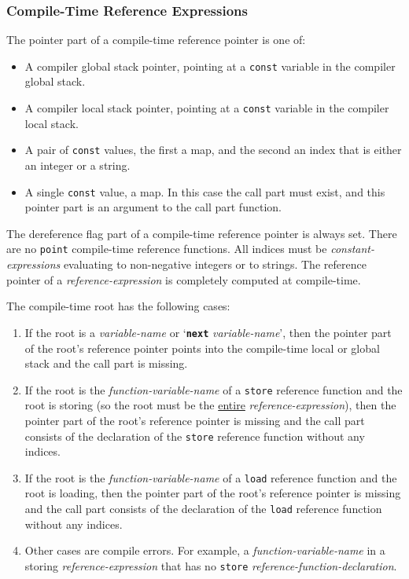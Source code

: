 \documentclass[12pt]{article}
\newcommand{\TT}[1]{{\tt \bfseries #1}}
\begin{document}
\subsubsection{Compile-Time Reference Expressions}
\label{COMPILE-TIME-REFERENCE-EXPRESSIONS}

The pointer part of a compile-time reference pointer is one of:
\begin{itemize}
\item A compiler global stack pointer, pointing at a {\tt const}
variable in the compiler global stack.
\item A compiler local stack pointer, pointing at a {\tt const}
variable in the compiler local stack.
\item A pair of {\tt const} values, the first a map, and the
second an index that is either an integer or a string.
\item A single {\tt const} value, a map.  In this case the call
part must exist, and this pointer part is an argument to the call part
function.
\end{itemize}
The dereference flag part of a compile-time reference pointer is
always set.  There are no {\tt point} compile-time reference functions.
All indices must be {\em constant-expressions} evaluating to non-negative
integers or to strings.  The reference pointer of a
{\em reference-expression} is completely computed at compile-time.

The compile-time root has the following cases:
\begin{enumerate}
\item If the root is a {\em variable-name} or
`\TT{next} {\em variable-name}', then the pointer part of the root's
reference pointer points into the compile-time local or global stack
and the call part is missing.
\item If the root is the {\em function-variable-name} of a
{\tt store} reference function and the root is storing
(so the root must be the \underline{entire} {\em reference-expression}),
then the pointer part of the root's
reference pointer is missing
and the call part consists of the
declaration of the {\tt store} reference function without any indices.
\item If the root is the {\em function-variable-name} of a
{\tt load} reference function
and the root is loading,
then the pointer part of the root's
reference pointer is missing and the call part consists of the
declaration of the {\tt load} reference function without any indices.
\item Other cases are compile errors.
For example, a {\em function-variable-name}
in a storing {\em reference-expression} that has no {\tt store}
{\em reference-function-declaration}.
\end{enumerate}
\end{document}
